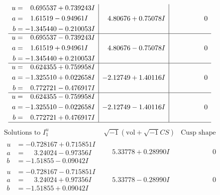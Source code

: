 \documentclass[1p]{elsarticle_modified}
\theoremstyle{definition}
\newcommand{\I}{\sqrt{-1}}
\begin{document}
$$\begin{array}{c|c|c}
\begin{aligned}
u &= \phantom{-}0.695537 + 0.739243 I \\
a &= \phantom{-}1.61519 - 0.94961 I \\
b &= -1.345440 - 0.210053 I\end{aligned}
 & \phantom{-}4.80676 + 0.75078 I & \phantom{-0.000000 } 0 \\ \hline\begin{aligned}
u &= \phantom{-}0.695537 - 0.739243 I \\
a &= \phantom{-}1.61519 + 0.94961 I \\
b &= -1.345440 + 0.210053 I\end{aligned}
 & \phantom{-}4.80676 - 0.75078 I & \phantom{-0.000000 } 0 \\ \hline\begin{aligned}
u &= \phantom{-}0.624355 + 0.759958 I \\
a &= -1.325510 + 0.022658 I \\
b &= \phantom{-}0.772721 - 0.476917 I\end{aligned}
 & -2.12749 + 1.40116 I & \phantom{-0.000000 } 0 \\ \hline\begin{aligned}
u &= \phantom{-}0.624355 - 0.759958 I \\
a &= -1.325510 - 0.022658 I \\
b &= \phantom{-}0.772721 + 0.476917 I\end{aligned}
 & -2.12749 - 1.40116 I & \phantom{-0.000000 } 0\\
 \hline 
 \end{array}$$\newpage$$\begin{array}{c|c|c}  
\text{Solutions to }I^u_{1}& \I (\text{vol} + \sqrt{-1}CS) & \text{Cusp shape}\\
 \hline 
\begin{aligned}
u &= -0.728167 + 0.715851 I \\
a &= \phantom{-}3.24024 - 0.97356 I \\
b &= -1.51855 - 0.09042 I\end{aligned}
 & \phantom{-}5.33778 + 0.28990 I & \phantom{-0.000000 } 0 \\ \hline\begin{aligned}
u &= -0.728167 - 0.715851 I \\
a &= \phantom{-}3.24024 + 0.97356 I \\
b &= -1.51855 + 0.09042 I\end{aligned}
 & \phantom{-}5.33778 - 0.28990 I & \phantom{-0.000000 } 0 \\ \hline\begin{aligned}

\end{aligned}
\end{array}$$
\end{document}
